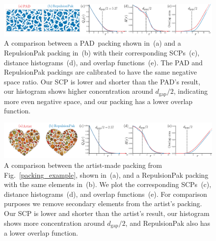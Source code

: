 \begin{figure}
\centering
\includegraphics[width=1.0\textwidth]{figures/metrics/pad_comparison.pdf}
\caption[A comparison between a PAD~packing and a RepulsionPak packing \newline  with their corresponding SCPs]
{\label{pad_comparison}
    A comparison between a PAD~packing shown in~(a) and a RepulsionPak packing in~(b) 
    with their corresponding SCPs~(c), distance histograms~(d), and overlap functions~(e). 
  The PAD and RepulsionPak packings are calibrated
  to have the same negative space ratio.
    Our SCP is lower and shorter than the PAD's result,
    our histogram shows higher concentration around $d_\mathrm{gap} / 2$,
    indicating more even negative space,
    and our packing has a lower overlap function.
}
\end{figure}

\begin{figure}
\centering
\includegraphics[width=1.0\textwidth]{figures/metrics/balabolka_comparison.pdf}
\caption[A comparison between the artist-made packing \newline  and a RepulsionPak packing]
{ \label{balabolka_comparison} 
    A comparison between the artist-made packing from 
  Fig.~\ref{packing_example}, shown in~(a), and a RepulsionPak packing
  with the same elements in~(b).  We plot the corresponding SCPs~(c),
  distance histograms~(d), and overlap functions~(e).
    For comparison purposes we remove secondary elements from the artist's
  packing.  Our SCP is lower and shorter than the artist's result,
    our histogram shows more concentration around $d_\mathrm{gap} / 2$,
    and RepulsionPak also has a lower overlap function.
}
\end{figure}

